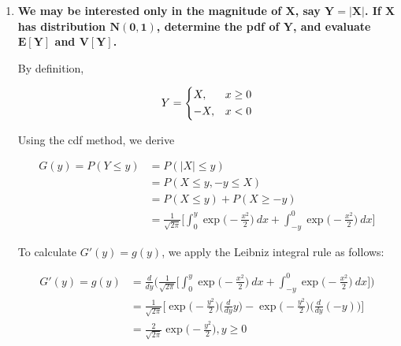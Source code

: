 \documentclass[10pt, oneside]{article}
\begin{document}
\begin{enumerate}[label=9.\arabic*]
For the 45 hour period, $\boxed{\text{device 2}}$ is preferred.

\textbf{48 hour period:}

\begin{align*}
P(D_1 > 48) &= P \bigg( \frac{D_1-60}{6} > \frac{48-40}{6} \bigg) = 1 - \Phi(4/3) \approx \boxed{0.0912 \quad \text{(device 1)}} \\
P(D_2 > 48) &= P \bigg( \frac{D_2 - 45}{3} > \frac{48-45}{3} \bigg) = 1 - \Phi(1) \approx \boxed{0.1587 \quad \text{(device 2)}}
\end{align*}

For the 48 hour period, $\boxed{\text{device 2}}$ is preferred.

\item  \begin{tcolorbox}[
  colback=Cerulean!5!white,
  colframe=Cerulean!75!black]
\textbf{We may be interested only in the magnitude of $\bm{X}$, say $\bm{Y = |X|}$. If $\bm{X}$ has distribution $\bm{N(0,1)}$, determine the pdf of $\bm{Y}$, and evaluate $\bm{E[Y]}$ and $\bm{V[Y]}$.}
\end{tcolorbox}

By definition,

\[ 
Y = \begin{dcases}
X, & x \geq 0 \\
-X, & x < 0
\end{dcases}
\]

Using the cdf method, we derive

\begin{align*}
G(y) = P(Y \leq y) &= P(|X| \leq y) \\
&= P(X \leq y, -y \leq X) \\
&= P(X \leq y) + P(X \geq -y) \\
&= \frac{1}{\sqrt{2 \pi}} \bigg[ \int^y_0 \exp \bigg( -\frac{x^2}{2} \bigg) \ dx + \int^0_{-y} \exp \bigg( -\frac{x^2}{2} \bigg) \ dx \bigg] 
\end{align*}

To calculate $G'(y) = g(y)$, we apply the Leibniz integral rule as follows:

\begin{align*}
G'(y) = g(y) &= \frac{d}{dy} \bigg( \frac{1}{\sqrt{2 \pi}} \bigg[ \int^y_0 \exp \bigg( -\frac{x^2}{2} \bigg) \ dx + \int^0_{-y} \exp \bigg( -\frac{x^2}{2} \bigg) \ dx \bigg] \bigg) \\
&= \frac{1}{\sqrt{2 \pi}} \bigg[ \exp \bigg( -\frac{y^2}{2} \bigg) \bigg( \frac{d}{dy} y \bigg) - \exp \bigg( -\frac{y^2}{2} \bigg) \bigg( \frac{d}{dy} (-y) \bigg) \bigg] \\
&= \boxed{\frac{2}{\sqrt{2 \pi}} \exp \bigg( -\frac{y^2}{2} \bigg), y \geq 0}
\end{align*}


\end{enumerate}
\end{document}

